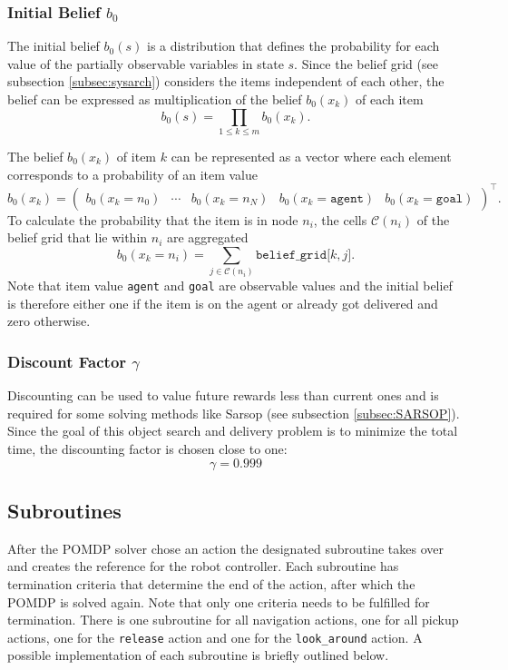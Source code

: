 \subsubsection{Initial Belief $b_0$}
The initial belief $b_0(s)$ is a distribution that defines the probability for each value of the partially observable variables in state $s$. Since the belief grid (see subsection \ref{subsec:sysarch}) considers the items independent of each other, the belief can be expressed as multiplication of the belief $b_0(x_k)$ of each item
\begin{equation}
    b_0(s) = \prod_{1\leq k \leq m} b_0(x_k).
\end{equation}

The belief $b_0(x_k)$ of item $k$ can be represented as a vector where each element corresponds to a probability of an item value 
\begin{equation}
    b_0(x_k) = \begin{pmatrix} b_0(x_k=n_0) & \cdots & b_0(x_k=n_N) & b_0(x_k=\texttt{agent}) & b_0(x_k=\texttt{goal}) \end{pmatrix}^\intercal.
\end{equation}
To calculate the probability that the item is in node $n_i$, the cells $\mathcal{C}(n_i)$ of the belief grid that lie within $n_i$ are aggregated
\begin{equation}
b_0\left(x_k=n_i\right) = \sum_{j\in \mathcal{C}(n_i)}\texttt{belief\_grid[$k, j$]}.
\end{equation}
Note that item value \texttt{agent} and \texttt{goal} are observable values and the initial belief is therefore either one if the item is on the agent or already got delivered and zero otherwise. 
\subsubsection{Discount Factor $\gamma$}
Discounting can be used to value future rewards less than current ones and is required for some solving methods like Sarsop (see subsection \ref{subsec:SARSOP}). Since the goal of this object search and delivery problem is to minimize the total time, the discounting factor is chosen close to one:
\begin{equation}
    \gamma = 0.999
\end{equation}
\subsection{Subroutines}\label{subsec:subroutine}
After the POMDP solver chose an action the designated subroutine takes over and creates the reference for the robot controller. Each subroutine has termination criteria that determine the end of the action, after which the POMDP is solved again. Note that only one criteria needs to be fulfilled for termination. There is one subroutine for all navigation actions, one for all pickup actions, one for the \texttt{release} action and one for the \texttt{look\_around} action. A possible implementation of each subroutine is briefly outlined below.\\

